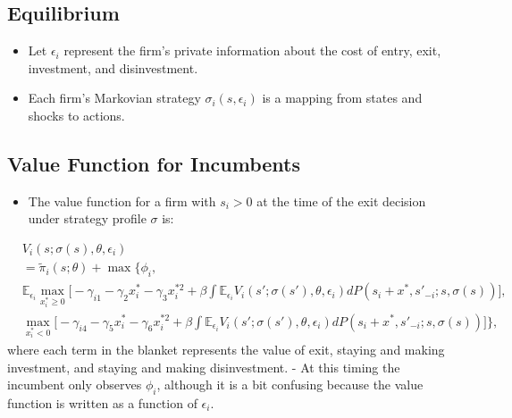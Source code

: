 \documentclass[
]{book}
\providecommand{\tightlist}{%
  \setlength{\itemsep}{0pt}\setlength{\parskip}{0pt}}
\begin{document}
\hypertarget{equilibrium}{%
\subsection{Equilibrium}\label{equilibrium}}

\begin{itemize}
\tightlist
\item
  Let \(\epsilon_i\) represent the firm's private information about the cost of entry, exit, investment, and disinvestment.
\item
  Each firm's Markovian strategy \(\sigma_i(s, \epsilon_i)\) is a mapping from states and shocks to actions.
\end{itemize}

\hypertarget{value-function-for-incumbents}{%
\subsection{Value Function for Incumbents}\label{value-function-for-incumbents}}

\begin{itemize}
\tightlist
\item
  The value function for a firm with \(s_i > 0\) at the time of the exit decision under strategy profile \(\sigma\) is:
\end{itemize}

\begin{equation}
\begin{split}
&V_i(s; \sigma(s), \theta, \epsilon_i)\\
&=\tilde{\pi}_i(s; \theta) + \max\Bigg\{\phi_i,\\
& \mathbb{E}_{\epsilon_i}\max_{x_i^* \ge 0}  \Bigg[ - \gamma_{i1} - \gamma_{2} x_i^* - \gamma_3 x_i^{*2} + \beta \int \mathbb{E}_{\epsilon_i} V_i(s'; \sigma(s'), \theta, \epsilon_i) dP(s_i + x^*, s'_{-i}; s, \sigma(s))\Bigg],\\
&\max_{x_i^* < 0} \Bigg[- \gamma_{i4} - \gamma_5 x_i^* - \gamma_6 x_i^{*2} + \beta \int \mathbb{E}_{\epsilon_i} V_i(s'; \sigma(s'), \theta, \epsilon_i) dP(s_i + x^*, s'_{-i}; s, \sigma(s))  \Bigg]\Bigg\},
\end{split}
\end{equation}
where each term in the blanket represents the value of exit, staying and making investment, and staying and making disinvestment.
- At this timing the incumbent only observes \(\phi_i\), although it is a bit confusing because the value function is written as a function of \(\epsilon_i\).
\end{document}
